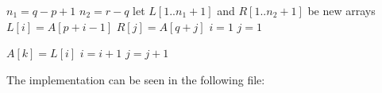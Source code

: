 
\begin{algorithmic}[1]
    \STATE $n_1 = q - p + 1$
    \STATE $n_2 = r - q$
    \STATE let $L[1..n_1 + 1]$ and $R[1..n_2 + 1]$ be new arrays
        \STATE $L[i] = A[p + i - 1]$
    \ENDFOR
        \STATE $R[j] = A[q + j]$
    \ENDFOR
    \STATE $i = 1$
    \STATE $j = 1$

            \STATE $A[k] = L[i]$
            \STATE $i = i + 1$
            \STATE $j = j + 1$
        \ENDIF
    \ENDFOR
\end{algorithmic}

The implementation can be seen in the following file:

